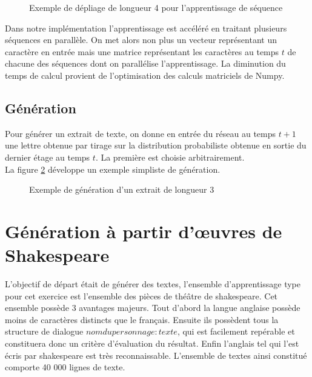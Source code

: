 \begin{figure}
\begin{center}

\caption{Exemple de dépliage de longueur 4 pour l'apprentissage de séquence}
\label{LSTM_unfold}
\end{center}
\end{figure}

Dans notre implémentation l'apprentissage est accéléré en traitant plusieurs séquences en parallèle. On met alors non plus un vecteur représentant un caractère en entrée mais une matrice représentant les caractères au temps $t$ de chacune des séquences dont on parallélise l'apprentissage. La diminution du temps de calcul provient de l'optimisation des calculs matriciels de Numpy.

\subsection{Génération}


Pour générer un extrait de texte, on donne en entrée du réseau au temps $t+1$ une lettre obtenue par tirage sur la distribution probabiliste obtenue en sortie du dernier étage au temps $t$.
La première est choisie arbitrairement.
\\La figure \ref{LSTM_generate} développe un exemple simpliste de génération.

\begin{figure}
\begin{center}

\caption{Exemple de génération d'un extrait de longueur 3}
\label{LSTM_generate}
\end{center}
\end{figure}

\section{Génération à partir d'œuvres de Shakespeare}
L'objectif de départ était de générer des textes, l'ensemble d'apprentissage type pour cet exercice est l'ensemble des pièces de théâtre de shakespeare. Cet ensemble possède 3 avantages majeurs. Tout d'abord la langue anglaise possède moins de caractères distincts que le français. Ensuite ils possèdent tous la structure de dialogue $nom du personnage : texte$, qui est facilement repérable et constituera donc un critère d'évaluation du résultat. Enfin l'anglais tel qui l'est écris par shakespeare est très reconnaissable.
L'ensemble de textes ainsi constitué comporte 40 000 lignes de texte.

